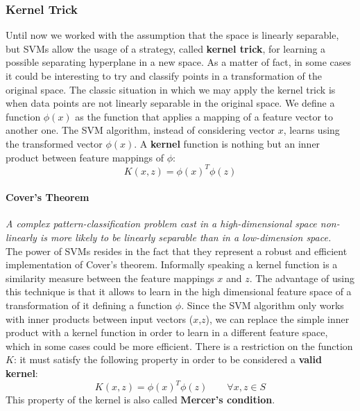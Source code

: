 

\subsubsection{Kernel Trick}
Until now we worked with the assumption that the space is linearly separable, but SVMs allow the usage of a strategy, called \textbf{kernel trick}, for learning a possible separating hyperplane in a new space.
As a matter of fact, in some cases it could be interesting to try and classify points in a transformation of the original space. The classic situation in which we may apply the kernel trick is when data points are not linearly separable in the original space. We define a function $\phi(x)$ as the function that applies a mapping of a feature vector to another one. The SVM algorithm, instead of considering vector $x$, learns using the transformed vector $\phi(x)$. A \textbf{kernel} function is nothing but an inner product between feature mappings of $\phi$:
$$K(x,z) = \phi(x)^T\phi(z)$$

\paragraph{Cover's Theorem} \textit{A complex pattern-classification problem cast in a high-dimensional space non-linearly is more likely to be linearly separable than in a low-dimension space.}\\

The power of SVMs resides in the fact that they represent a robust and efficient implementation of Cover's theorem.
Informally speaking a kernel function is a similarity measure between the feature mappings $x$ and $z$.
The advantage of using this technique is that it allows to learn in the high dimensional feature space of a transformation of it defining a function $\phi$. 
Since the SVM algorithm only works with inner products between input vectors ($x$,$z$), we can replace the simple inner product with a kernel function in order to learn in a different feature space, which in some cases could be more efficient. There is a restriction on the function $K$: it must satisfy the following property in order to be considered a \textbf{valid kernel}:
$$K(x,z) = \phi(x)^T\phi(z) \qquad \forall x, z \in S$$
This property of the kernel is also called \textbf{Mercer's condition}.

